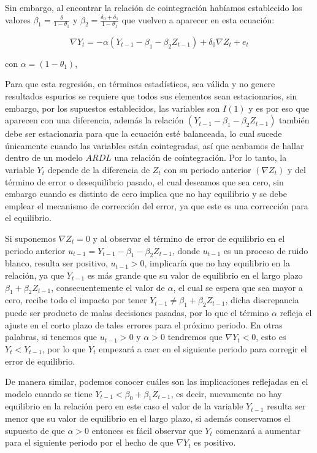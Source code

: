 Sin embargo, al encontrar la relación de cointegración habíamos establecido los valores  $\beta_1=\frac{\delta}{1-\theta_1}$ y $\beta_2=\frac{\delta_0 + \delta_1}{1-\theta_1}$  que vuelven a aparecer en esta ecuación:

 \begin{equation}\label{eq:rcoint}
\nabla Y_t = -\alpha \left (   Y_{t-1} - \beta_1  -\beta_2 Z_{t-1} \right ) + \delta_0 \nabla Z_t  + e_t   
\end{equation}
 
 con $\alpha=(1-\theta_1)$,\bigskip
 
 Para que esta regresión, en términos estadísticos, sea válida y no genere resultados espurios se requiere que todos sus elementos sean estacionarios, sin embargo, por los supuestos establecidos, las variables son $I(1)$ y es por eso que aparecen con una diferencia, además la relación  $\left (   Y_{t-1} - \beta_1  -\beta_2 Z_{t-1} \right )$ también debe ser estacionaria para que la ecuación esté balanceada, lo cual sucede únicamente cuando las variables están cointegradas, así que acabamos de hallar dentro de un modelo $ARDL$ una relación de cointegración. Por lo tanto, la variable $Y_t$ depende de la diferencia de $Z_t$ con su periodo anterior $(\nabla Z_t )$ y del término de error o desequilibrio pasado, el cual deseamos que sea cero, sin embargo cuando es distinto de cero implica que no hay equilibrio y se debe emplear el mecanismo de corrección del error, ya que este es una corrección para el equilibrio.  \bigskip
 
 Si suponemos $ \nabla Z_t =0$  y al observar el término de error de equilibrio en el periodo anterior $u_{t-1}=Y_{t-1} - \beta_1  -\beta_2 Z_{t-1} $, donde $u_{t-1}$ es un proceso de ruido blanco, resulta ser positivo, $  u_{t-1}> 0$, implicaría  que no hay equilibrio en la relación, ya que $Y_{t-1}$ es más grande que su valor de equilibrio en el largo plazo $ \beta_1  + \beta_2 Z_{t-1}$, consecuentemente el valor de  $\alpha$, el cual se espera que sea mayor a cero, recibe todo el impacto por tener   $Y_{t-1} \neq  \beta_1  + \beta_2 Z_{t-1}$, dicha discrepancia puede ser producto de malas decisiones pasadas, por lo que el término $\alpha$ refleja el ajuste en el corto plazo de tales errores para el próximo periodo. En otras palabras, si tenemos que $u_{t-1}>0$ y $\alpha>0$   tendremos que $\nabla Y_t <0$, esto es $Y_t < Y_{t-1}$, por lo que $Y_t$ empezará a caer en el siguiente periodo para corregir el error de equilibrio.    \bigskip
 
De manera similar, podemos conocer cuáles son las implicaciones reflejadas en el modelo cuando se tiene  $Y_{t-1}< \beta_0 + \beta_1 Z_{t-1}$, es decir, nuevamente no hay equilibrio en la relación pero en este caso el valor de la variable $Y_{t-1}$ resulta ser menor que su valor de equilibrio en el largo plazo, si además conservamos el supuesto de que $\alpha >0$ entonces es fácil observar que $Y_{t}$ comenzará a aumentar para el siguiente periodo por el hecho de que $\nabla Y_t$ es positivo.\bigskip


